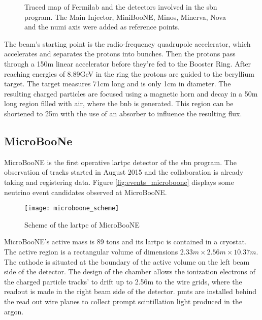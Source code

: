 \begin{figure}
{
  }
  \caption{%
    Traced map of Fermilab and the detectors involved in the \gls{sbn} program.
    The Main Injector, MiniBooNE, Minos, Minerva, Nova and the \gls{numi} axis were added as reference points.
  }
  \label{fig:sbnp}
\end{figure}

The beam's starting point is the radio-frequency quadrupole accelerator, which accelerates and separates the protons into bunches.
Then the protons pass through a 150m linear accelerator before they're fed to the Booster Ring.
After reaching energies of 8.89GeV in the ring the protons are guided to the beryllium target.
The target measures 71cm long and is only 1cm in diameter.
The resulting charged particles are focused using a magnetic horn and decay in a 50m long region filled with air, where the \gls{bnb} is generated.
This region can be shortened to 25m with the use of an absorber to influence the resulting flux.

\subsection{MicroBooNe}

MicroBooNE is the first operative \gls{lartpc} detector of the \gls{sbn} program.
The observation of tracks started in August 2015 and the collaboration is already taking and registering data.
Figure \ref{fig:events_microboone} displays some neutrino event candidates observed at MicroBooNE.

\begin{figure}
  \centering
  \texttt{[image: microboone\_scheme]}
  \caption{Scheme of the \gls{lartpc} of MicroBooNE}
  \label{fig:microboone_concept}
\end{figure}

MicroBooNE's active mass is 89 tons and its \gls{lartpc} is contained in a cryostat.
The active region is a rectangular volume of dimensions $2.33m \times 2.56m \times 10.37m$.
The cathode is situated at the boundary of the active volume on the left beam side of the detector.
The design of the chamber allows the ionization electrons of the charged particle tracks' to drift up to 2.56m to the wire grids, where the readout is made in the right beam side of the detector.
\Glspl{pmt} are installed behind the read out wire planes to collect prompt scintillation light produced in the argon.


